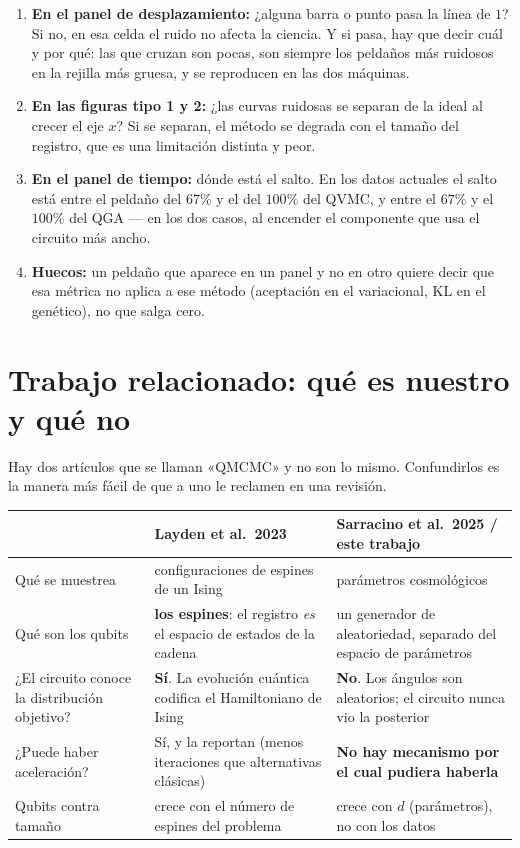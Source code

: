 \documentclass[11pt,a4paper]{article}
\begin{document}
\begin{enumerate}[leftmargin=1.6em]
  \item \textbf{En el panel de desplazamiento:} ¿alguna barra o punto pasa la
    línea de $1$? Si no, en esa celda el ruido no afecta la ciencia. Y si
    pasa, hay que decir cuál y por qué: las que cruzan son pocas, son
    siempre los peldaños más ruidosos en la rejilla más gruesa, y se
    reproducen en las dos máquinas.
  \item \textbf{En las figuras tipo 1 y 2:} ¿las curvas ruidosas se separan
    de la ideal al crecer el eje $x$? Si se separan, el método se degrada
    con el tamaño del registro, que es una limitación distinta y peor.
  \item \textbf{En el panel de tiempo:} dónde está el salto. En los datos
    actuales el salto está entre el peldaño del $67\%$ y el del $100\%$
    del QVMC, y entre el $67\%$ y el $100\%$ del QGA --- en los dos
    casos, al encender el componente que usa el circuito más ancho.
  \item \textbf{Huecos:} un peldaño que aparece en un panel y no en otro
    quiere decir que esa métrica no aplica a ese método (aceptación en el
    variacional, KL en el genético), no que salga cero.
\end{enumerate}

\section{Trabajo relacionado: qué es nuestro y qué no}\label{sec:relacionado}

Hay dos artículos que se llaman «QMCMC» y no son lo mismo. Confundirlos es
la manera más fácil de que a uno le reclamen en una revisión.

\begin{center}
\small
\begin{tabular}{@{}p{3.1cm}p{4.6cm}p{4.6cm}@{}}
\toprule
& \textbf{Layden et al.\ 2023} & \textbf{Sarracino et al.\ 2025 / este trabajo} \\
\midrule
Qué se muestrea
  & configuraciones de espines de un Ising
  & parámetros cosmológicos \\
\addlinespace
Qué son los qubits
  & \textbf{los espines}: el registro \emph{es} el espacio de estados de
    la cadena
  & un generador de aleatoriedad, separado del espacio de parámetros \\
\addlinespace
¿El circuito conoce la distribución objetivo?
  & \textbf{Sí}. La evolución cuántica codifica el Hamiltoniano de Ising
  & \textbf{No}. Los ángulos son aleatorios; el circuito nunca vio la
    posterior \\
\addlinespace
¿Puede haber aceleración?
  & Sí, y la reportan (menos iteraciones que alternativas clásicas)
  & \textbf{No hay mecanismo por el cual pudiera haberla} \\
\addlinespace
Qubits contra tamaño
  & crece con el número de espines del problema
  & crece con $d$ (parámetros), no con los datos \\
\bottomrule
\end{tabular}
\end{center}
\end{document}
